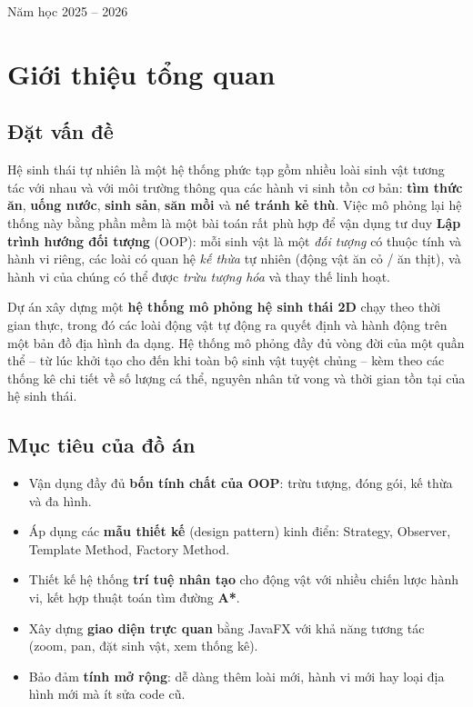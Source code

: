 \documentclass[12pt,a4paper]{report}
\newcommand{\keyword}[1]{\textcolor{primaryblue}{\textbf{#1}}}
\begin{document}
\begin{titlepage}
    \vfill
    {\large Năm học 2025 -- 2026}
\end{titlepage}

\tableofcontents
\newpage

\chapter{Giới thiệu tổng quan}

\section{Đặt vấn đề}

Hệ sinh thái tự nhiên là một hệ thống phức tạp gồm nhiều loài sinh vật tương tác với nhau và với môi trường thông qua các hành vi sinh tồn cơ bản: \keyword{tìm thức ăn}, \keyword{uống nước}, \keyword{sinh sản}, \keyword{săn mồi} và \keyword{né tránh kẻ thù}. Việc mô phỏng lại hệ thống này bằng phần mềm là một bài toán rất phù hợp để vận dụng tư duy \keyword{Lập trình hướng đối tượng} (OOP): mỗi sinh vật là một \textit{đối tượng} có thuộc tính và hành vi riêng, các loài có quan hệ \textit{kế thừa} tự nhiên (động vật ăn cỏ / ăn thịt), và hành vi của chúng có thể được \textit{trừu tượng hóa} và thay thế linh hoạt.

Dự án xây dựng một \keyword{hệ thống mô phỏng hệ sinh thái 2D} chạy theo thời gian thực, trong đó các loài động vật tự động ra quyết định và hành động trên một bản đồ địa hình đa dạng. Hệ thống mô phỏng đầy đủ vòng đời của một quần thể -- từ lúc khởi tạo cho đến khi toàn bộ sinh vật tuyệt chủng -- kèm theo các thống kê chi tiết về số lượng cá thể, nguyên nhân tử vong và thời gian tồn tại của hệ sinh thái.

\section{Mục tiêu của đồ án}

\begin{itemize}[leftmargin=1.5em]
    \item Vận dụng đầy đủ \keyword{bốn tính chất của OOP}: trừu tượng, đóng gói, kế thừa và đa hình.
    \item Áp dụng các \keyword{mẫu thiết kế} (design pattern) kinh điển: Strategy, Observer, Template Method, Factory Method.
    \item Thiết kế hệ thống \keyword{trí tuệ nhân tạo} cho động vật với nhiều chiến lược hành vi, kết hợp thuật toán tìm đường \keyword{A*}.
    \item Xây dựng \keyword{giao diện trực quan} bằng JavaFX với khả năng tương tác (zoom, pan, đặt sinh vật, xem thống kê).
    \item Bảo đảm \keyword{tính mở rộng}: dễ dàng thêm loài mới, hành vi mới hay loại địa hình mới mà ít sửa code cũ.
\end{itemize}
\end{document}
